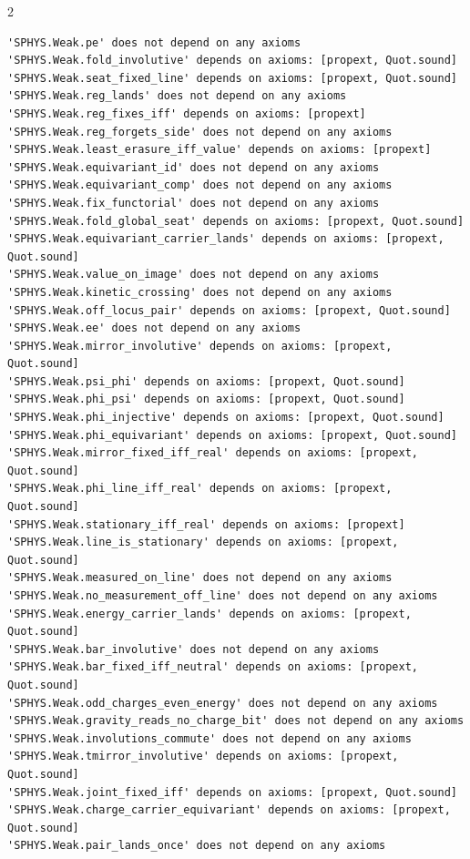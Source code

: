 \documentclass[10pt]{article}
\begin{document}
\begin{multicols}{2}
\begin{Verbatim}[fontsize=\fontsize{6.2}{7.2}\selectfont,breaklines,breakanywhere,breaksymbolleft={}]
'SPHYS.Weak.pe' does not depend on any axioms
'SPHYS.Weak.fold_involutive' depends on axioms: [propext, Quot.sound]
'SPHYS.Weak.seat_fixed_line' depends on axioms: [propext, Quot.sound]
'SPHYS.Weak.reg_lands' does not depend on any axioms
'SPHYS.Weak.reg_fixes_iff' depends on axioms: [propext]
'SPHYS.Weak.reg_forgets_side' does not depend on any axioms
'SPHYS.Weak.least_erasure_iff_value' depends on axioms: [propext]
'SPHYS.Weak.equivariant_id' does not depend on any axioms
'SPHYS.Weak.equivariant_comp' does not depend on any axioms
'SPHYS.Weak.fix_functorial' does not depend on any axioms
'SPHYS.Weak.fold_global_seat' depends on axioms: [propext, Quot.sound]
'SPHYS.Weak.equivariant_carrier_lands' depends on axioms: [propext, Quot.sound]
'SPHYS.Weak.value_on_image' does not depend on any axioms
'SPHYS.Weak.kinetic_crossing' does not depend on any axioms
'SPHYS.Weak.off_locus_pair' depends on axioms: [propext, Quot.sound]
'SPHYS.Weak.ee' does not depend on any axioms
'SPHYS.Weak.mirror_involutive' depends on axioms: [propext, Quot.sound]
'SPHYS.Weak.psi_phi' depends on axioms: [propext, Quot.sound]
'SPHYS.Weak.phi_psi' depends on axioms: [propext, Quot.sound]
'SPHYS.Weak.phi_injective' depends on axioms: [propext, Quot.sound]
'SPHYS.Weak.phi_equivariant' depends on axioms: [propext, Quot.sound]
'SPHYS.Weak.mirror_fixed_iff_real' depends on axioms: [propext, Quot.sound]
'SPHYS.Weak.phi_line_iff_real' depends on axioms: [propext, Quot.sound]
'SPHYS.Weak.stationary_iff_real' depends on axioms: [propext]
'SPHYS.Weak.line_is_stationary' depends on axioms: [propext, Quot.sound]
'SPHYS.Weak.measured_on_line' does not depend on any axioms
'SPHYS.Weak.no_measurement_off_line' does not depend on any axioms
'SPHYS.Weak.energy_carrier_lands' depends on axioms: [propext, Quot.sound]
'SPHYS.Weak.bar_involutive' does not depend on any axioms
'SPHYS.Weak.bar_fixed_iff_neutral' depends on axioms: [propext, Quot.sound]
'SPHYS.Weak.odd_charges_even_energy' does not depend on any axioms
'SPHYS.Weak.gravity_reads_no_charge_bit' does not depend on any axioms
'SPHYS.Weak.involutions_commute' does not depend on any axioms
'SPHYS.Weak.tmirror_involutive' depends on axioms: [propext, Quot.sound]
'SPHYS.Weak.joint_fixed_iff' depends on axioms: [propext, Quot.sound]
'SPHYS.Weak.charge_carrier_equivariant' depends on axioms: [propext, Quot.sound]
'SPHYS.Weak.pair_lands_once' does not depend on any axioms

\end{Verbatim}
\end{multicols}
\end{document}
